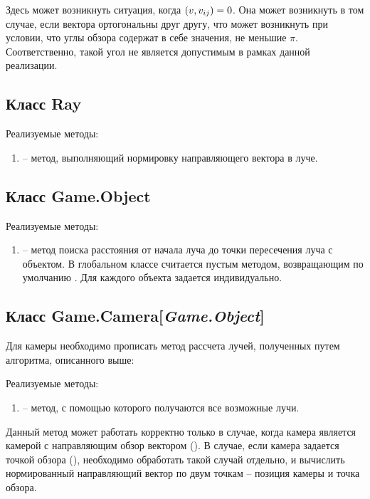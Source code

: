 	Здесь может возникнуть ситуация, когда \( \left( v, v_{ij} \right) = 0 \). Она может возникнуть в том случае, если вектора ортогональны друг другу, что может возникнуть при условии, что углы обзора содержат в себе значения, не меньшие $\pi$. Соответственно, такой угол не является допустимым в рамках данной реализации. 


\subsection{Класс Ray}
	\noindent Реализуемые методы:
	\begin{enumerate}
		\item {} -- метод, выполняющий нормировку направляющего вектора в луче.
	\end{enumerate}


\subsection{Класс Game.Object}
	\noindent Реализуемые методы:
	\begin{enumerate}
		\item {} -- метод поиска расстояния от начала луча до точки пересечения луча с объектом. В глобальном классе считается пустым методом, возвращающим по умолчанию . Для каждого объекта задается индивидуально.
	\end{enumerate}


\subsection{Класс Game.Camera[\textit{Game.Object}]}
	Для камеры необходимо прописать метод рассчета лучей, полученных путем алгоритма, описанного выше:

	\noindent Реализуемые методы:
	\begin{enumerate}
		\item {} -- метод, с помощью которого получаются все возможные лучи.
	\end{enumerate}

	Данный метод может работать корректно только в случае, когда камера является камерой с направляющим обзор вектором (). В случае, если камера задается точкой обзора (), необходимо обработать такой случай отдельно, и вычислить нормированный направляющий вектор по двум точкам -- позиция камеры и точка обзора.


